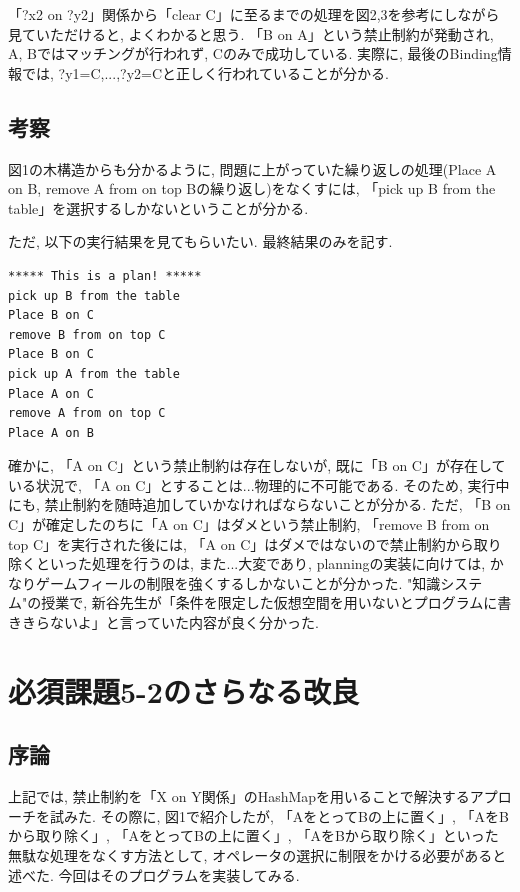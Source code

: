 \documentclass[12pt]{jarticle}
\begin{document}
「?x2 on ?y2」関係から「clear C」に至るまでの処理を図2,3を参考にしながら見ていただけると, よくわかると思う. 「B on A」という禁止制約が発動され, A, Bではマッチングが行われず, Cのみで成功している. 実際に, 最後のBinding情報では, {?y1=C,...,?y2=C}と正しく行われていることが分かる.

\subsection{考察}
図1の木構造からも分かるように, 問題に上がっていた繰り返しの処理(Place A on B, remove A from on top Bの繰り返し)をなくすには, 「pick up B from the table」を選択するしかないということが分かる.

ただ, 以下の実行結果を見てもらいたい. 最終結果のみを記す.
\begin{lstlisting}[caption=A on Cが生じてしまう, label=src:No1]
***** This is a plan! *****
pick up B from the table
Place B on C
remove B from on top C
Place B on C
pick up A from the table
Place A on C
remove A from on top C
Place A on B
\end{lstlisting}


確かに, 「A on C」という禁止制約は存在しないが, 既に「B on C」が存在している状況で, 「A on C」とすることは...物理的に不可能である. そのため, 実行中にも, 禁止制約を随時追加していかなければならないことが分かる. ただ, 「B on C」が確定したのちに「A on C」はダメという禁止制約, 「remove B from on top C」を実行された後には, 「A on C」はダメではないので禁止制約から取り除くといった処理を行うのは, また...大変であり, planningの実装に向けては, かなりゲームフィールの制限を強くするしかないことが分かった. "知識システム"の授業で, 新谷先生が「条件を限定した仮想空間を用いないとプログラムに書ききらないよ」と言っていた内容が良く分かった.


\section{必須課題5-2のさらなる改良}
\subsection{序論}
上記では, 禁止制約を「X on Y関係」のHashMapを用いることで解決するアプローチを試みた. その際に, 図1で紹介したが, 「AをとってBの上に置く」, 「AをBから取り除く」, 「AをとってBの上に置く」, 「AをBから取り除く」といった無駄な処理をなくす方法として, オペレータの選択に制限をかける必要があると述べた. 今回はそのプログラムを実装してみる.
\end{document}
